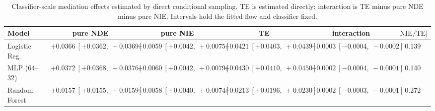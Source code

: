 \begin{table}[htbp]
  \centering
  \caption{Classifier-scale mediation effects estimated by direct conditional sampling. TE is estimated directly; interaction is TE minus pure NDE minus pure NIE. Intervals hold the fitted flow and classifier fixed.}
  \label{tab:german_synth_m0_gap_overall}
  \begin{tabular}{lccccc}
    \toprule
    Model & pure NDE & pure NIE & TE & interaction & $|\mathrm{NIE}/\mathrm{TE}|$ \\
    \midrule
    Logistic Reg. & $+0.0366\ [+0.0362,\ +0.0369]$ & $+0.0059\ [+0.0042,\ +0.0075]$ & $+0.0421\ [+0.0403,\ +0.0439]$ & $-0.0003\ [-0.0004,\ -0.0002]$ & 0.139 \\
    MLP (64--32) & $+0.0372\ [+0.0368,\ +0.0376]$ & $+0.0060\ [+0.0042,\ +0.0079]$ & $+0.0430\ [+0.0410,\ +0.0450]$ & $-0.0002\ [-0.0004,\ -0.0001]$ & 0.140 \\
    Random Forest & $+0.0157\ [+0.0155,\ +0.0159]$ & $+0.0058\ [+0.0040,\ +0.0074]$ & $+0.0213\ [+0.0196,\ +0.0230]$ & $-0.0002\ [-0.0003,\ -0.0001]$ & 0.272 \\
    \bottomrule
  \end{tabular}
\end{table}